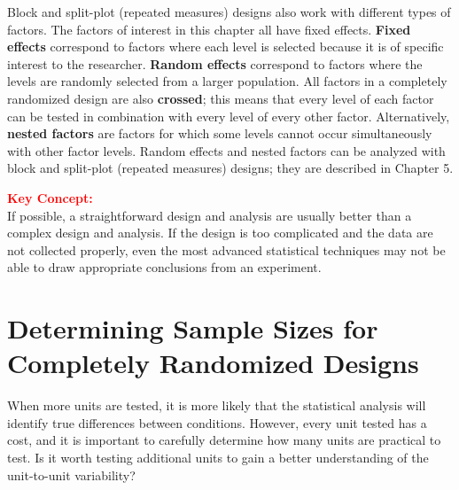 \documentclass[
]{report}
\begin{document}
Block and split-plot (repeated measures) designs also work with different types of factors. The factors of interest in this chapter all have fixed effects. \textbf{Fixed effects} correspond to factors where each level is selected because it is of specific interest to the researcher. \textbf{Random effects} correspond to factors where the levels are randomly selected from a larger population. All factors in a completely randomized design are also \textbf{crossed}; this means that every level of each factor can be tested in combination with every level of every other factor. Alternatively, \textbf{nested factors} are factors for which some levels cannot occur simultaneously with other factor levels. Random effects and nested factors can be analyzed with block and split-plot (repeated measures) designs; they are described in Chapter 5.
\normalsize

\large

\textbf{\textcolor{red}{Key Concept:}}\\
\color{red}
If possible, a straightforward design and analysis are usually better than a complex design and analysis. If the design is too complicated and the data are not collected properly, even the most advanced statistical techniques may not be able to draw appropriate conclusions from an experiment.
\color{black}
\normalsize

\hypertarget{determining-sample-sizes-for-completely-randomized-designs}{%
\section{\texorpdfstring{\textbf{Determining Sample Sizes for Completely Randomized Designs}}{Determining Sample Sizes for Completely Randomized Designs}}\label{determining-sample-sizes-for-completely-randomized-designs}}

When more units are tested, it is more likely that the statistical analysis will identify true differences between conditions. However, every unit tested has a cost, and it is important to carefully determine how many units are practical to test. Is it worth testing additional units to gain a better understanding of the unit-to-unit variability?
\end{document}
